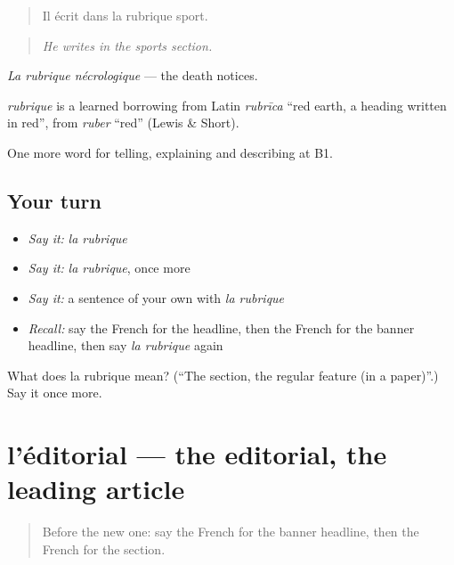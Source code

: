 \begin{quote}
Il écrit dans la rubrique sport.
\end{quote}

\begin{quote}
\emph{He writes in the sports section.}
\end{quote}

\emph{La rubrique nécrologique} — the death notices.

\begin{cousinweb}
\emph{rubrique} is a learned borrowing from Latin \emph{rubrīca} \textquotedblleft{}red earth, a heading written in red\textquotedblright{}, from \emph{ruber} \textquotedblleft{}red\textquotedblright{} (Lewis \& Short).
\end{cousinweb}

\begin{grammarlens}[title={What you've built}]
One more word for telling, explaining and describing at B1.
\end{grammarlens}

\subsection*{Your turn}
\begin{itemize}
\raggedright
  \item \emph{Say it:} \emph{la rubrique}
  \item \emph{Say it:} \emph{la rubrique}, once more
  \item \emph{Say it:} a sentence of your own with \emph{la rubrique}
  \item \emph{Recall:} say the French for the headline, then the French for the banner headline, then say \emph{la rubrique} again
\end{itemize}

\begin{tcolorbox}[breakable,colback=teal!4,colframe=teal!35!black,title={Before you move on}]
What does la rubrique mean? (\textquotedblleft{}The section, the regular feature (in a paper)\textquotedblright{}.) Say it once more.
\end{tcolorbox}
\section[l'éditorial]{l'éditorial — the editorial, the leading article}

\label{lesson:FR-C282-editorial}



\begin{quote}
Before the new one: say the French for the banner headline, then the French for the section.
\end{quote}

